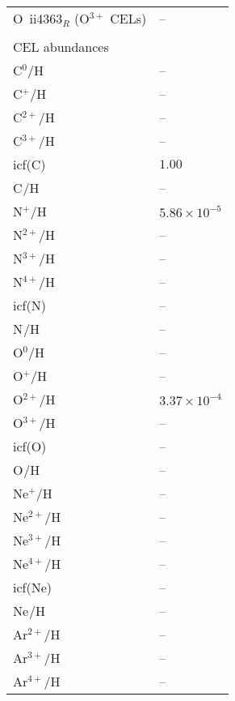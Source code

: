 \begin{longtable}[l]{ll}
 O~{\sc ii}4363$_R$ (O$^{3+}$ CELs)  & -- \\
 \vspace{0.2cm}\\\multicolumn{2}{l}{CEL abundances}\\ \hline
 C$^{0}$/H                           & -- \\
 C$^{+}$/H                           & -- \\
 C$^{2+}$/H                          & -- \\
 C$^{3+}$/H                          & -- \\
 icf(C)                              & $  1.00$\\
 C$^{}$/H                            & -- \\
 N$^{+}$/H                           & $  5.86\times 10^{ -5}$\\
 N$^{2+}$/H                          & -- \\
 N$^{3+}$/H                          & -- \\
 N$^{4+}$/H                          & -- \\
 icf(N)                              & -- \\
 N$^{}$/H                            & -- \\
 O$^{0}$/H                           & -- \\
 O$^{+}$/H                           & -- \\
 O$^{2+}$/H                          & $  3.37\times 10^{ -4}$\\
 O$^{3+}$/H                          & -- \\
 icf(O)                              & -- \\
 O$^{}$/H                            & -- \\
 Ne$^{+}$/H                          & -- \\
 Ne$^{2+}$/H                         & -- \\
 Ne$^{3+}$/H                         & -- \\
 Ne$^{4+}$/H                         & -- \\
 icf(Ne)                             & -- \\
 Ne$^{}$/H                           & -- \\
 Ar$^{2+}$/H                         & -- \\
 Ar$^{3+}$/H                         & -- \\
 Ar$^{4+}$/H                         & -- \\

\end{longtable}
